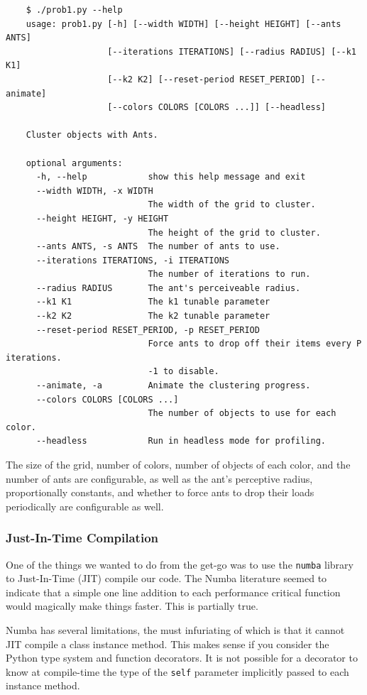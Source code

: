 \documentclass[12pt]{article}
\begin{document}
\begin{verbatim}
    $ ./prob1.py --help
    usage: prob1.py [-h] [--width WIDTH] [--height HEIGHT] [--ants ANTS]
                    [--iterations ITERATIONS] [--radius RADIUS] [--k1 K1]
                    [--k2 K2] [--reset-period RESET_PERIOD] [--animate]
                    [--colors COLORS [COLORS ...]] [--headless]

    Cluster objects with Ants.

    optional arguments:
      -h, --help            show this help message and exit
      --width WIDTH, -x WIDTH
                            The width of the grid to cluster.
      --height HEIGHT, -y HEIGHT
                            The height of the grid to cluster.
      --ants ANTS, -s ANTS  The number of ants to use.
      --iterations ITERATIONS, -i ITERATIONS
                            The number of iterations to run.
      --radius RADIUS       The ant's perceiveable radius.
      --k1 K1               The k1 tunable parameter
      --k2 K2               The k2 tunable parameter
      --reset-period RESET_PERIOD, -p RESET_PERIOD
                            Force ants to drop off their items every P iterations.
                            -1 to disable.
      --animate, -a         Animate the clustering progress.
      --colors COLORS [COLORS ...]
                            The number of objects to use for each color.
      --headless            Run in headless mode for profiling.
\end{verbatim}

The size of the grid, number of colors, number of objects of each color, and the number of ants are configurable, as well as the ant's perceptive radius, proportionally constants, and whether to force ants to drop their loads periodically are configurable as well.

\subsubsection{Just-In-Time Compilation}
One of the things we wanted to do from the get-go was to use the \texttt{numba} library to Just-In-Time (JIT) compile our code.
The Numba literature seemed to indicate that a simple one line addition to each performance critical function would magically make things faster.
This is partially true.

Numba has several limitations, the must infuriating of which is that it cannot JIT compile a class instance method.
This makes sense if you consider the Python type system and function decorators.
It is not possible for a decorator to know at compile-time the type of the \texttt{self} parameter implicitly passed to each instance method.
\end{document}
